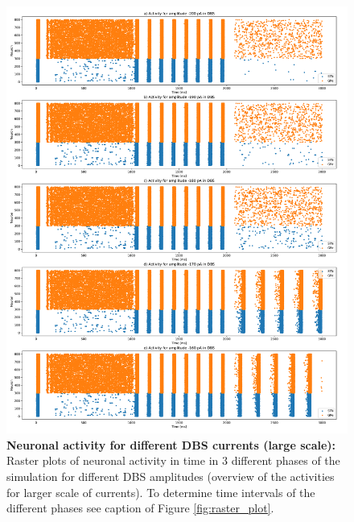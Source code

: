 \documentclass[11pt]{article}
\begin{document}
\begin{figure}[tb]
    \centering
    \includegraphics[width=\textwidth]{images/different_dbs_amplitudes.pdf}
    \caption{\textbf{Neuronal activity for different DBS currents (large scale):} 
    Raster plots of neuronal activity in time in 3 different phases of 
    the simulation for different DBS amplitudes
    (overview of the activities for larger scale of currents).
    To determine time intervals of the different phases see caption of Figure
    \ref{fig:raster_plot}.}
    \label{fig:different_DBS}
\end{figure}
\end{document}
